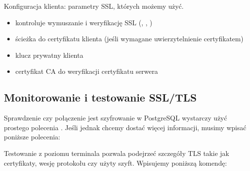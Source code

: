\documentclass[a4paper,11pt,polish]{sphinxmanual}
\begin{document}
\sphinxAtStartPar
Konfiguracja klienta: parametry SSL, których możemy użyć.
\begin{itemize}
\item {} 
\sphinxAtStartPar
{} \sphinxhyphen{} kontroluje wymuszanie i weryfikację SSL (, , )

\item {} 
\sphinxAtStartPar
{} \sphinxhyphen{} ścieżka do certyfikatu klienta (jeśli wymagane uwierzytelnienie certyfikatem)

\item {} 
\sphinxAtStartPar
{} \sphinxhyphen{}  klucz prywatny klienta

\item {} 
\sphinxAtStartPar
{} \sphinxhyphen{} certyfikat CA do weryfikacji certyfikatu serwera

\end{itemize}


\subsection{Monitorowanie i testowanie SSL/TLS}
\label{\detokenize{Bezpieczenstwo/index:monitorowanie-i-testowanie-ssl-tls}}
\sphinxAtStartPar
Sprawdzenie czy połączenie jest szyfrowanie w PostgreSQL wystarczy użyć prostego polecenia . Jeśli jednak chcemy dostać więcej informacji, musimy wpisać poniższe polecenia:

\begin{sphinxVerbatim}[commandchars=\\\{\}]
      
 
     
  
\end{sphinxVerbatim}

\sphinxAtStartPar
Testowanie z poziomu terminala pozwala podejrzeć szczegóły TLS takie jak certyfikaty, wesję protokołu czy użyty szyft. Wpisujemy poniższą komendę:
\end{document}
